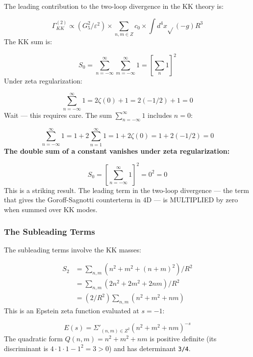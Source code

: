 \documentclass[aps,prd,preprint,superscriptaddress,longbibliography,floatfix]{revtex4-2}
\theoremstyle{remark}
\begin{document}
The leading contribution to the two-loop divergence in the KK theory is:


\begin{equation}
    \Gamma^{(2)}_{KK} \propto (G_{5}^{2}/\varepsilon^{2}) \times \sum_{n,m \in Z} c_{0} \times \int d^{4}x \sqrt{}(-g) R^{3}
\end{equation}
The KK sum is:


\begin{equation}
    S_{0} = \sum_{n=-\infty}^{\infty} \sum_{m=-\infty}^{\infty} 1 = [\sum_n 1]^{2}
\end{equation}
Under zeta regularization:


\begin{equation}
    \sum_{n=-\infty}^{\infty} 1 = 2\zeta(0) + 1 = 2(-1/2) + 1 = 0
\end{equation}
Wait --- this requires care. The sum $\sum_{n=-\infty}^{\infty} 1$ includes $n = 0$:


\begin{equation}
    \sum_{n=-\infty}^{\infty} 1 = 1 + 2\sum_{n=1}^{\infty} 1 = 1 + 2\zeta(0) = 1 + 2(-1/2) = 0
\end{equation}
\textbf{The double sum of a constant vanishes under zeta regularization:}


\begin{equation}
    S_{0} = [\sum_{n=-\infty}^{\infty} 1]^{2} = 0^{2} = 0
\end{equation}
This is a striking result. The leading term in the two-loop divergence --- the term that gives the Goroff-Sagnotti counterterm in 4D --- is MULTIPLIED by zero when summed over KK modes.


\subsubsection{The Subleading Terms}

The subleading terms involve the KK masses:


\begin{align}
    S_{2} &= \sum_{n,m} (n^{2} + m^{2} + (n+m)^{2}) / R^{2} \\
    & = \sum_{n,m} (2n^{2} + 2m^{2} + 2nm) / R^{2} \\
    & = (2/R^{2}) \sum_{n,m} (n^{2} + m^{2} + nm)
\end{align}
This is an Epstein zeta function evaluated at $s = -1$:


\begin{equation}
    E(s) = \Sigma'_{(n,m) \in Z^{2}} (n^{2} + m^{2} + nm)^{-s}
\end{equation}
The quadratic form $Q(n,m) = n^{2} + m^{2} + nm$ is positive definite (its discriminant is $4\cdot1\cdot1 - 1^{2} = 3 > 0$) and has determinant \texttt{3/4}.
\end{document}
